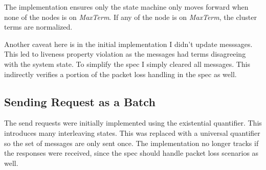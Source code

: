 \documentclass{report}
\begin{document}
The implementation ensures only the state machine only moves forward when none
of the nodes is on \textit{MaxTerm}. If any of the node is on \textit{MaxTerm},
the cluster terms are normalized.\newline

Another caveat here is in the initial implementation I didn't update messsages.
This led to liveness property violation as the messages had terms disagreeing
with the system state. To simplify the spec I simply cleared all messages. This 
indirectly verifies a portion of the packet loss handling in the spec as well.

\subsection{Sending Request as a Batch}

The send requests were initially implemented using the existential quantifier. 
This introduces many interleaving states. This was replaced with a universal
quantifier so the set of messages are only sent once. The implementation no
longer tracks if the responses were received, since the spec should handle
packet loss scenarios as well.\newline
\end{document}
